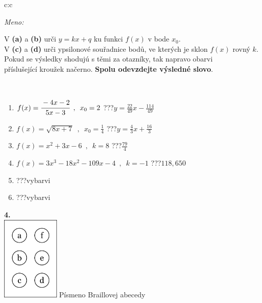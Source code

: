 \documentclass[10pt]{report}
\begin{document}
\begin{tabular}{c:c}
\begin{minipage}[c][104.5mm][t]{0.5\linewidth}
\begin{center}
\textit{Meno:}\phantom{xxxxxxxxxxxxxxxxxxxxxxxxxxxxxxxxxxxxxxxxxxxxxxxxxxxxxxxxxxxxxxxxx}\\[5mm]
\begin{minipage}{0.95\linewidth}
\begin{center}
V \textbf{(a)} a \textbf{(b)} urči  $y = kx + q$ ku funkci $f(x)$ v bode $x_0$.\\V \textbf{(c)} a \textbf{(d)} urči ypsilonové souřadnice bodů, ve kterých je sklon $f(x)$ rovný $k$.\\Pokud se výsledky shodujú s těmi za otazníky, tak napravo obarvi\\příslušející kroužek načerno. \textbf{Spolu odevzdejte výsledné slovo}.
\end{center}
\end{minipage}
\\[1mm]
\begin{minipage}{0.79\linewidth}
\begin{center}
\begin{varwidth}{\linewidth}
\begin{enumerate}
\small
\item $f(x)=\cfrac{-4x-2}{5x-3}\enspace , \enspace x_0=2$\quad \dotfill\; ???\;\dotfill \quad $y = \frac{22}{49}x-\frac{114}{49}$
\item $f(x)=\sqrt{8x+7}\enspace , \enspace x_0=\frac{1}{4}$\quad \dotfill\; ???\;\dotfill \quad $y = \frac{4}{3}x+\frac{16}{3}$
\item $f(x)=x^2+3x-6\enspace , \enspace k=8$\quad \dotfill\; ???\;\dotfill \quad $\frac{79}{4}$
\item $f(x)=3x^3-18x^2-109x-4\enspace , \enspace k=-1$\quad \dotfill\; ???\;\dotfill \quad $118 , 650$
\item \quad \dotfill\; ???\;\dotfill \quad vybarvi
\item \quad \dotfill\; ???\;\dotfill \quad vybarvi
\end{enumerate}
\end{varwidth}
\end{center}
\end{minipage}
\begin{minipage}{0.20\linewidth}
\begin{center}
{\Huge\bfseries 4.} \\[2mm]
\includegraphics[height=40mm]{../images/braille.png}
{\small Písmeno Braillovej abecedy}
\end{center}
\end{minipage}
\end{center}
\end{minipage}
%
\end{tabular}
\end{document}

